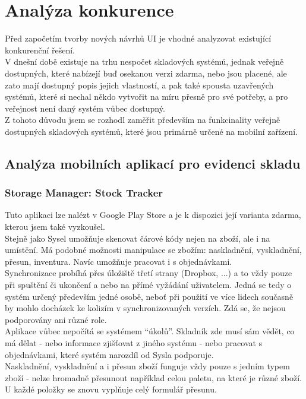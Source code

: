 
\section{Analýza konkurence}

Před započetím tvorby nových návrhů UI je vhodné analyzovat existující konkurenční řešení.\\
V dnešní době existuje na trhu nespočet skladových systémů, jednak veřejně dostupných, které nabízejí buď osekanou verzi zdarma, nebo jsou placené, ale zato mají dostupný popis jejich vlastností, a pak také spousta uzavřených systémů, které si nechal někdo vytvořit na míru přesně pro své potřeby, a pro veřejnost není daný systém vůbec dostupný.\\
Z tohoto důvodu jsem se rozhodl zaměřit především na funkcinality veřejně dostupných skladových systémů, které jsou primárně určené na mobilní zařízení.\\

\subsection{Analýza mobilních aplikací pro evidenci skladu}

\subsubsection{Storage Manager: Stock Tracker}

Tuto aplikaci lze nalézt v Google Play Store a je k dispozici její varianta zdarma, kterou jsem také vyzkoušel.\\
Stejně jako Sysel umožňuje skenovat čárové kódy nejen na zboží, ale i na umístění. Má podobné možnosti manipulace se zbožím: naskladnění, vyskladnění, přesun, inventura. Navíc umožňuje pracovat i s objednávkami.\\
Synchronizace probíhá přes úložiště třetí strany (Dropbox, ...) a to vždy pouze při spuštění či ukončení a nebo na přímé vyžádání uživatelem. Jedná se tedy o systém určený především jedné osobě, neboť při použití ve více lidech současně by mohlo docházek ke kolizím v synchronizovaných verzích. Zdá se, že nejsou podporovány ani různé role.\\
Aplikace vůbec nepočítá se systémem “úkolů”. Skladník zde musí sám vědět, co má dělat - nebo informace zjišťovat z jiného systému - nebo pracovat s objednávkami, které systém narozdíl od Sysla podporuje.\\
Naskladnění, vyskladnění a i přesun zboží funguje vždy pouze s jedním typem zboží - nelze hromadně přesunout například celou paletu, na které je různé zboží. U každé položky se znovu vyplňuje celý formulář přesunu.\\

